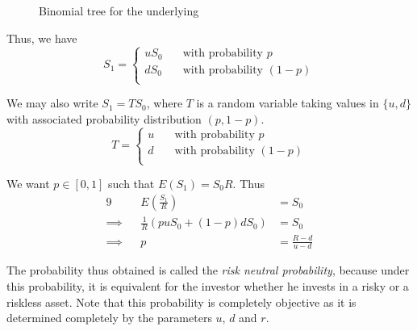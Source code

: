 \begin{figure}
	
	\caption{Binomial tree for the underlying}
	\label{fig:crr-2tr-underlying}
\end{figure}


Thus, we have
\begin{equation*}
	S_1 =
	\begin{cases}
		u S_0 & \quad \text{with probability } p \\
		d S_0 & \quad \text{with probability } (1 - p) \\		
	\end{cases}
\end{equation*}

We may also write $ S_1 = T S_0 $, where $ T $ is a random variable taking values in $ \{ u, d \} $ with associated probability distribution $ (p, 1-p) $.
\begin{equation*}
	T =
	\begin{cases}
		u  & \quad \text{with probability } p \\
		d  & \quad \text{with probability } (1 - p) \\		
	\end{cases}
\end{equation*}


We want $ p \in [0,1] $ such that $ E(S_1) = S_0 R $. Thus
\begin{alignat}{9}
	          &&  E(\frac{S_1}{R}) &= S_0 \\
	\implies  &&  \frac{1}{R} ( p u S_0 + ( 1 - p ) d S_0 )  & =  S_0 \nonumber \\
	\implies  &&  p  & =  \frac{R - d}{u - d}
\end{alignat}

The probability thus obtained is called the \emph{risk neutral probability}, because under this probability, it is equivalent for the investor whether he invests in a risky or a riskless asset. Note that this probability is completely objective as it is determined completely by the parameters $ u $, $ d $ and $ r $.

